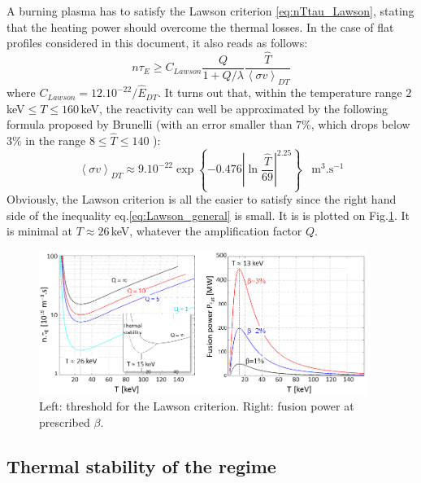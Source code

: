 A burning plasma has to satisfy the Lawson criterion \ref{eq:nTtau_Lawson}, stating that the heating power should overcome the thermal losses. In the case of flat profiles considered in this document, it also reads as follows:
\begin{equation}
 \label{eq:Lawson_general}
 n\tau_E \geq C_{Lawson} 
 \frac{Q}{1+Q/\lambda}
 \frac{\hat T}{\left< \sigma v \right>_{DT}}
\end{equation}
where $C_{Lawson} = 12.10^{-22}/\hat E_{DT}$. It turns out that, within the temperature range $2\,$keV$\leq T \leq 160\,$keV, the reactivity can well be approximated by the following formula proposed by Brunelli (with an error smaller than $7\%$, which drops below $3\%$ in the range $8\leq \hat T \leq 140$ \cite{FusionCEA1987}):
\begin{equation}
  \left< \sigma v \right>_{DT} \approx 9.10^{-22}
  \exp\left\{ -0.476 \left| \ln\frac{\hat T}{69} \right|^{2.25}\right\}
  \;\;\;\textrm{m}^3.\textrm{s}^{-1}
\end{equation}
Obviously, the Lawson criterion is all the easier to satisfy since the right hand side of the inequality eq.\ref{eq:Lawson_general} is small. It is is plotted on Fig.\ref{fig:ntauE_Pfus_Tchoice}. It is minimal at $T\approx 26\,$keV, whatever the amplification factor $Q$.

\begin{figure} 
	\begin{center}
		\includegraphics[width=0.95\textwidth]{figures/Fig_ntauE_Pfus_Tchoice_v3.png}
		\caption{Left: threshold for the Lawson criterion. Right: fusion power at prescribed $\beta$.}
		\label{fig:ntauE_Pfus_Tchoice}
	\end{center}
\end{figure}


\subsection*{Thermal stability of the regime}

